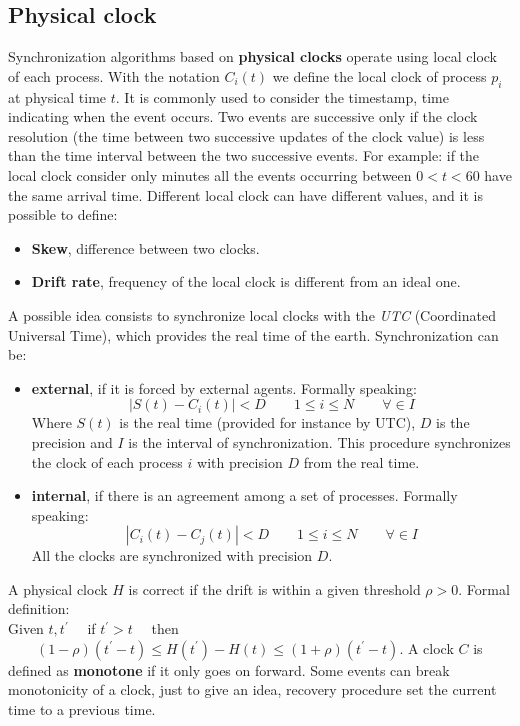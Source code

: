 \documentclass[11pt,a4paper]{article}
\begin{document}
\subsection{Physical clock}
Synchronization algorithms based on \textbf{physical clocks} operate using local clock of each process.
With the notation $C_i(t)$ we define the local clock of process $p_i$ at physical time $t$. It is commonly used to consider the timestamp, time indicating when the event occurs.
Two events are successive only if the clock resolution (the time between two successive updates of the clock value) is less than the time interval between the two successive events. For example: if the local clock consider only minutes all the events occurring between $0 < t < 60$ have the same arrival time.
Different local clock can have different values, and it is possible to define:
\begin{itemize}
	\item \textbf{Skew}, difference between two clocks.
	\item \textbf{Drift rate}, frequency of the local clock is different from an ideal one.
\end{itemize}
A possible idea consists to synchronize local clocks with the \textit{UTC} (Coordinated Universal Time), which provides the real time of the earth.
Synchronization can be:
\begin{itemize}
	\item \textbf{external}, if it is forced by external agents.
	Formally speaking:
	$$|S(t) - C_i(t)| < D	\qquad 1 \leq i \leq N \qquad \forall \in I$$
	Where $S(t)$ is the real time (provided for instance by UTC), $D$ is the precision and $I$ is the interval of synchronization. This procedure synchronizes the clock of each process $i$ with precision $D$ from the real time.
	
 	\item \textbf{internal}, if there is an agreement among a set of processes.	Formally speaking:
 	$$|C_i(t) - C_j(t)| < D	\qquad 1 \leq i \leq N \qquad \forall \in I$$
 	All the clocks are synchronized with precision $D$.
\end{itemize}

A physical clock $H$ is correct if the drift is within a given threshold $\rho > 0$. Formal definition:\\
Given $t,t^\prime \quad$ if $t^\prime > t\quad$ then $\qquad(1-\rho)(t^\prime - t) \leq H(t^\prime) - H(t) \leq (1+ \rho)(t^\prime - t)$.
A clock $C$ is defined as \textbf{monotone} if it only goes on forward. 
Some events can break monotonicity of a clock, just to give an idea, recovery procedure set the current time to a previous time. \\
\end{document}

